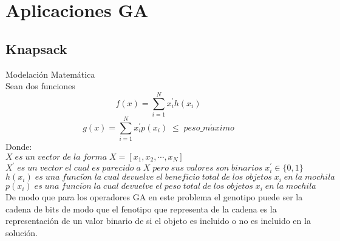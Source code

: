 \documentclass[10pt]{article}
\begin{document}
\section{Aplicaciones GA}
\subsection{Knapsack}
Modelación Matemática\\
Sean dos funciones
\[f(x)=\sum_{i=1}^{N}x^{'}_{i}h(x_{i})\]
\[g(x)=\sum_{i=1}^{N}x^{'}_{i}p(x_{i})\;\leq\;peso\_m\acute{a}ximo\]
Donde:\\
\(\displaystyle X\;es\;un\;vector\;de\;la\;forma\;X=[x_{1},x_{2},\cdots,x_{N}]\)\\\vspace{0.25cm}
\(\displaystyle X^{'}\;es\;un\;vector\;el\;cual\;es\;parecido\;a\;X\;pero\;sus\;valores\;son\;binarios\;x_{i}^{'}\in\{0,1\}\)\\\vspace{0.25cm}
\(\displaystyle h(x_{i})\;es\;una\;funci\acute{o}n\;la\;cual\;devuelve\;el\;beneficio\;total\;de\;los\;objetos\;x_{i}\;en\;la\;mochila\)\\\vspace{0.25cm}
\(\displaystyle p(x_{i})\;es\;una\;funci\acute{o}n\;la\;cual\;devuelve\;el\;peso\;total\;de\;los\;objetos\;x_{i}\;en\;la\;mochila\)\\\vspace{0.25cm}
De modo que para los operadores GA en este problema el genotipo puede ser la cadena de bits de modo que el fenotipo que representa de la cadena es la representación de un valor binario de si el objeto es incluido o no es incluido en la solución.
\end{document}

